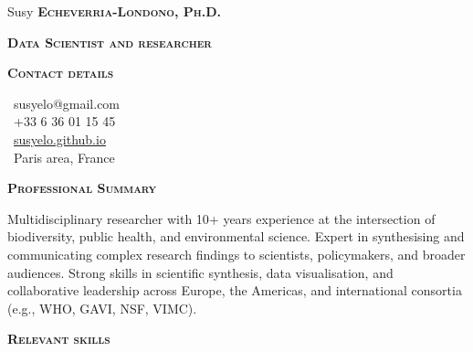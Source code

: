 \documentclass[10pt, a4paper]{article}
\newcommand{\headleft}[1]{\vspace*{3ex}\textsc{\textbf{#1}}\par%
    \vspace*{-1.5ex}\hrulefill\par\vspace*{0.7ex}}
\begin{document}
\setlength{\topskip}{0pt}
\setlength{\parindent}{0pt}
\setlength{\parskip}{0pt}
\setlength{\fboxsep}{0pt}
\pagestyle{empty}
\raggedbottom

\begin{minipage}[t]{0.33\textwidth} %
\colorbox{cvblue}{\begin{minipage}[t][5mm][t]{\textwidth}\null\hfill\null\end{minipage}}

\vspace{-.2ex} %
\colorbox{cvblue!90}{\color{white}  %
\textwidth\relax%
\begin{minipage}[t][293mm][t]{0.82\textwidth}
\raggedright
\vspace*{2.5ex}

\Large Susy \textbf{\textsc{Echeverria-Londono, Ph.D.}} \normalsize 

\textbf{\textsc{Data Scientist and researcher}} 


\headleft{Contact details}
\small %
\MVAt\ {\small susyelo@gmail.com} \\[0.4ex]
\Mobilefone\ +33 6 36 01 15 45 \\[0.5ex]
\Mundus\ \href{https://susyelo.github.io/}{susyelo.github.io} \\[0.1ex]
\Letter\ Paris area, France
\normalsize

\vspace*{0.5ex} %

\headleft{Professional Summary}
Multidisciplinary researcher with 10+ years experience at the intersection of biodiversity, public health, and environmental science. Expert in synthesising and communicating complex research findings to scientists, policymakers, and broader audiences. Strong skills in scientific synthesis, data visualisation, and collaborative leadership across Europe, the Americas, and international consortia (e.g., WHO, GAVI, NSF, VIMC).

\headleft{Relevant skills}
\begin{itemize}


\end{itemize}
\end{minipage}}
\end{minipage}
\end{document}

